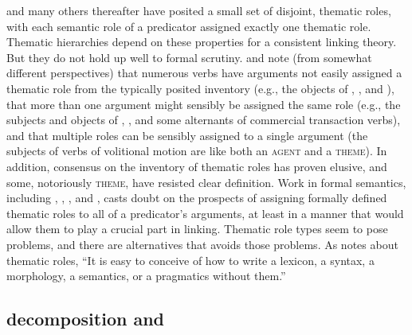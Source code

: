 \documentclass[output=paper]{langsci/langscibook}
\begin{document}
\citet{Fillmore1968} and many others thereafter have posited a small set of disjoint, thematic roles, with each semantic role of a predicator assigned exactly one thematic role.
Thematic hierarchies depend on these properties for a consistent linking theory.
But they do not hold up well to formal scrutiny.
\citet{Jackendoff1987} and \citet{Dowty91a} note (from somewhat different perspectives) that numerous verbs have arguments not easily assigned a thematic role from the typically posited inventory (e.g., the objects of , , and ), that more than one argument might sensibly be assigned the same role (e.g., the subjects and objects of , , and some alternants of commercial transaction verbs), and that multiple roles can be sensibly assigned to a single argument (the subjects of verbs of volitional motion are like both an \textsc{agent} and a \textsc{theme}).
In addition, consensus on the inventory of thematic roles has proven elusive, and some, notoriously \textsc{theme}, have resisted clear definition.
Work in formal semantics, including \citet{LadusawandDowty1988}, \citet{Dowty1989}, \citet{Landman2000}, and \cite{Schein2002}, casts doubt on the prospects of assigning formally defined thematic roles to all of a predicator's arguments, at least in a manner that would allow them to play a crucial part in linking.
Thematic role types seem to pose problems, and there are alternatives that avoids those problems.  As \citet{Carlson1998} notes about thematic roles, ``It is easy to conceive of how to write a lexicon, a syntax, a morphology, a semantics, or a pragmatics without them.''

%

\subsection{\content decomposition and \argst}

%
%
%
\end{document}

